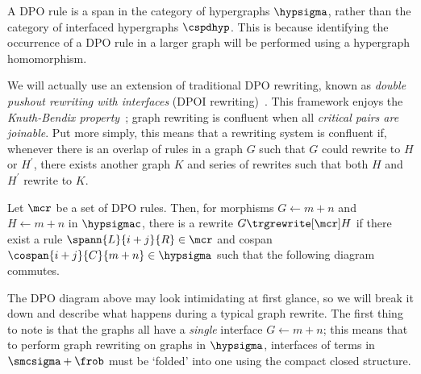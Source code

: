 A DPO rule is a span in the category of hypergraphs \(\hypsigma\),
rather than the category of interfaced hypergraphs \(\cspdhyp\).
This is because identifying the occurrence of a DPO rule in a larger graph will
be performed using a hypergraph homomorphism.

We will actually use an extension of traditional DPO rewriting, known as
\emph{double pushout rewriting with interfaces}
(DPOI rewriting)~\cite{bonchi2017confluence}.
This framework enjoys the \emph{Knuth-Bendix property}~\cite{knuth1970simple};
graph rewriting is confluent when all \emph{critical pairs are joinable}.
Put more simply, this means that a rewriting system is confluent if, whenever
there is an overlap of rules in a graph \(G\) such that \(G\) could rewrite to
\(H\) or \(H^\prime\), there exists another graph \(K\) and series of rewrites
such that both \(H\) and \(H^\prime\) rewrite to \(K\).

\begin{definition}\label{def:dpo-rewriting}
    Let \(\mcr\) be a set of DPO rules.
    Then, for morphisms \(G \leftarrow m + n\) and
    \(H \leftarrow m + n\) in
    \(\hypsigmac\), there is a rewrite \(G \trgrewrite[\mcr] H\) if there
    exist a rule \(
    \spann{L}{i + j}{R} \in \mcr
    \) and cospan \(
    \cospan{i + j}{C}{m + n} \in \hypsigma
    \) such that the following diagram commutes.
    \begin{center}
    \end{center}
\end{definition}

The DPO diagram above may look intimidating at first glance, so we will
break it down and describe what happens during a typical graph rewrite.
The first thing to note is that the graphs all have a \emph{single} interface
\(G \leftarrow m + n\); this means that to perform graph rewriting on graphs in
\(\hypsigma\), interfaces of terms in \(\smcsigma + \frob\) must be `folded'
into one using the compact closed structure.

